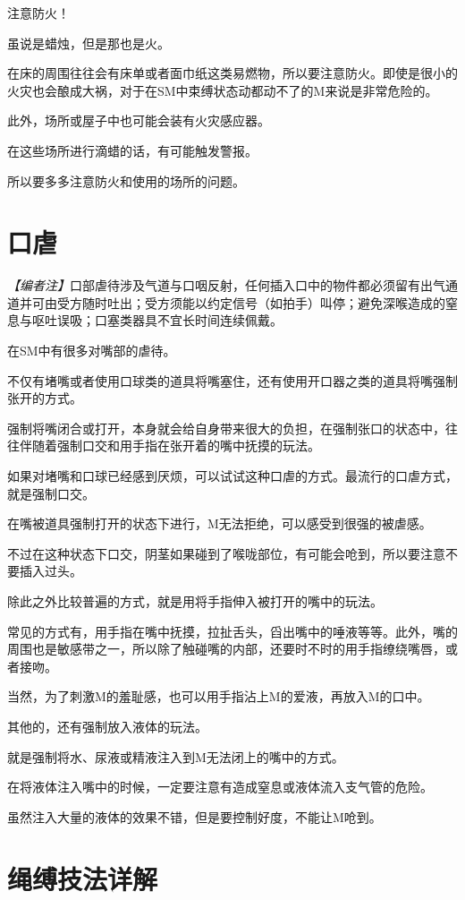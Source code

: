 \documentclass[12pt,UTF8]{ctexbook}
\begin{document}
注意防火！

虽说是蜡烛，但是那也是火。

在床的周围往往会有床单或者面巾纸这类易燃物，所以要注意防火。即使是很小的火灾也会酿成大祸，对于在SM中束缚状态动都动不了的M来说是非常危险的。

此外，场所或屋子中也可能会装有火灾感应器。

在这些场所进行滴蜡的话，有可能触发警报。

所以要多多注意防火和使用的场所的问题。

\section{口虐}

\noindent\textit{【编者注】}口部虐待涉及气道与口咽反射，任何插入口中的物件都必须留有出气通道并可由受方随时吐出；受方须能以约定信号（如拍手）叫停；避免深喉造成的窒息与呕吐误吸；口塞类器具不宜长时间连续佩戴。

在SM中有很多对嘴部的虐待。

不仅有堵嘴或者使用口球类的道具将嘴塞住，还有使用开口器之类的道具将嘴强制张开的方式。

强制将嘴闭合或打开，本身就会给自身带来很大的负担，在强制张口的状态中，往往伴随着强制口交和用手指在张开着的嘴中抚摸的玩法。

如果对堵嘴和口球已经感到厌烦，可以试试这种口虐的方式。最流行的口虐方式，就是强制口交。

在嘴被道具强制打开的状态下进行，M无法拒绝，可以感受到很强的被虐感。

不过在这种状态下口交，阴茎如果碰到了喉咙部位，有可能会呛到，所以要注意不要插入过头。

除此之外比较普遍的方式，就是用将手指伸入被打开的嘴中的玩法。

常见的方式有，用手指在嘴中抚摸，拉扯舌头，舀出嘴中的唾液等等。此外，嘴的周围也是敏感带之一，所以除了触碰嘴的内部，还要时不时的用手指缭绕嘴唇，或者接吻。

当然，为了刺激M的羞耻感，也可以用手指沾上M的爱液，再放入M的口中。

其他的，还有强制放入液体的玩法。

就是强制将水、尿液或精液注入到M无法闭上的嘴中的方式。

在将液体注入嘴中的时候，一定要注意有造成窒息或液体流入支气管的危险。

虽然注入大量的液体的效果不错，但是要控制好度，不能让M呛到。

\section{绳缚技法详解}\label{sec:shibari}
\end{document}
